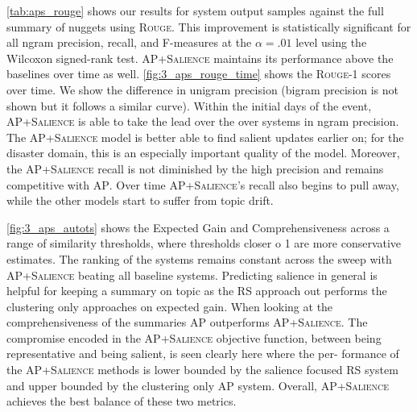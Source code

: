 \autoref{tab:aps_rouge}  shows  our  results  for  system  output
samples against the full summary of nuggets using \textsc{Rouge}. 
This improvement is statistically significant  for  all  ngram  
precision,  recall,  and  F-measures at the
$\alpha=.01$
level using the Wilcoxon
signed-rank test.
\textsc{AP+Salience}
maintains    its    performance
above  the  baselines  over  time  as  well.
\autoref{fig:3_aps_rouge_time}  shows  the  \textsc{Rouge-1}  scores  over  
time.
We  show  the  difference  in  unigram  precision
(bigram  precision  is  not  shown  but  it  follows a
similar  curve).
Within  the  initial  days  of  the
event,  \textsc{AP+Salience}
is  able  to  take  the  lead
over  the  over  systems  in  ngram  precision.   The
\textsc{AP+Salience}
model is better able to find salient
updates earlier on; for the disaster domain, this is
an especially important quality of the model.
Moreover, the \textsc{AP+Salience} recall is not diminished by the high 
precision and remains competitive with \textsc{AP}. 
Over time \textsc{AP+Salience}'s recall also begins to pull away, 
while the other models start to suffer from topic drift.


\autoref{fig:3_aps_autots} shows the Expected Gain and Comprehensiveness 
across a range
of  similarity  thresholds,  where  thresholds  closer
o 1 are more conservative estimates. The ranking
of the systems remains constant across the sweep
with \textsc{AP+Salience}
beating all baseline systems.
Predicting salience in general is helpful for keeping a summary on topic as the  \textsc{RS}  approach out
performs  the  clustering  only  approaches  on  expected gain.
When looking at the comprehensiveness of the
summaries \textsc{AP} outperforms \textsc{AP+Salience}.  
The compromise  encoded  in  the  \textsc{AP+Salience}
objective function, between being representative and
being salient, is seen clearly here where the per-
formance of the \textsc{AP+Salience}
methods is lower
bounded by the salience focused  RS  system and
upper bounded by the clustering only AP system.
Overall, \textsc{AP+Salience}
achieves the best balance
of these two metrics.



